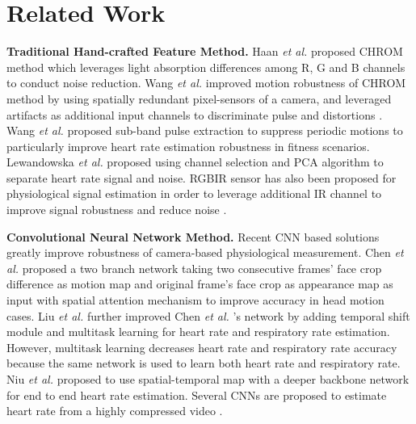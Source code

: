 \documentclass[conference]{IEEEtran}
\begin{document}
\section{Related Work}
\label{sec:related_work}

\textbf{Traditional Hand-crafted Feature Method.} Haan \textit{et al.} \cite{de2013robust} proposed CHROM method which leverages light absorption differences among R, G and B channels to conduct noise reduction. Wang \textit{et al.} \cite{wang2015novel} improved motion robustness of CHROM method by using spatially redundant pixel-sensors of a camera, and leveraged artifacts as additional input channels to discriminate pulse and distortions \cite{wang2019discriminative}. Wang \textit{et al.} \cite{wang2017robust} proposed sub-band pulse extraction to suppress periodic motions to particularly improve heart rate estimation robustness in fitness scenarios. Lewandowska \textit{et al.} \cite{lewandowska2011measuring} proposed using channel selection and PCA algorithm to separate heart rate signal and noise. RGBIR sensor has also been proposed for physiological signal estimation in order to leverage additional IR channel to improve signal robustness and reduce noise \cite{wang2020modified}.


\textbf{Convolutional Neural Network Method.} Recent CNN based solutions greatly improve robustness of camera-based physiological measurement. Chen \textit{et al.} \cite{chen2018deepphys} proposed a two branch network taking two consecutive frames' face crop difference as motion map and original frame's face crop as appearance map as input with spatial attention mechanism to improve accuracy in head motion cases. Liu \textit{et al.} \cite{liu2020multi} further improved Chen \textit{et al.} \cite{chen2018deepphys}'s network by adding temporal shift module \cite{lin2019temporal} and multitask learning for heart rate and respiratory rate estimation. However, multitask learning decreases heart rate and respiratory rate accuracy because the same network is used to learn both heart rate and respiratory rate. Niu \textit{et al.} \cite{niu2019rhythmnet} proposed to use spatial-temporal map with a deeper backbone network for end to end heart rate estimation. Several CNNs are proposed to estimate heart rate from a highly compressed video \cite{rapczynski2019effects, yu2019remote}.
\end{document}
